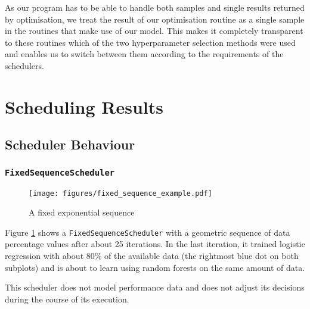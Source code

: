 \documentclass[a4paper,12pt,twoside,openright]{report}
\begin{document}


As our program has to be able to handle both samples and single results returned by optimisation, we treat the result of our optimisation routine as a single sample in the routines that make use of our model. This makes it completely transparent to these routines which of the two hyperparameter selection methods were used and enables us to switch between them according to the requirements of the schedulers.




\section{Scheduling Results}


\subsection{Scheduler Behaviour}

\subsubsection{\texttt{FixedSequenceScheduler}}
\begin{figure}
\centering
  \texttt{[image: figures/fixed\_sequence\_example.pdf]}
  \caption{A fixed exponential sequence}
  \label{fixedsequenceexample}
\end{figure}

Figure \ref{fixedsequenceexample} shows a \texttt{FixedSequenceScheduler} with a geometric sequence of data percentage values after about 25 iterations. In the last iteration, it trained logistic regression with about 80\% of the available data (the rightmost blue dot on both subplots) and is about to learn using random forests on the same amount of data.

This scheduler does not model performance data and does not adjust its decisions during the course of its execution.
\end{document}

